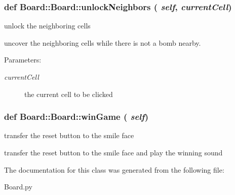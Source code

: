 \subsubsection{\setlength{\rightskip}{0pt plus 5cm}def Board::Board::unlock\-Neighbors ( {\em self},  {\em current\-Cell})}\label{classBoard_1_1Board_c9aeffd80ce1962d7d8777ae048cb88c}


unlock the neighboring cells 

uncover the neighboring cells while there is not a bomb nearby. \begin{Desc}
\item[Parameters:]
\begin{description}
\item[{\em current\-Cell}]the current cell to be clicked \end{description}
\end{Desc}
\subsubsection{\setlength{\rightskip}{0pt plus 5cm}def Board::Board::win\-Game ( {\em self})}\label{classBoard_1_1Board_3e5789c074e189e3bea8f7c7212467d8}


transfer the reset button to the smile face 

transfer the reset button to the smile face and play the winning sound 

The documentation for this class was generated from the following file:\begin{CompactItemize}
\item 
Board.py\end{CompactItemize}
